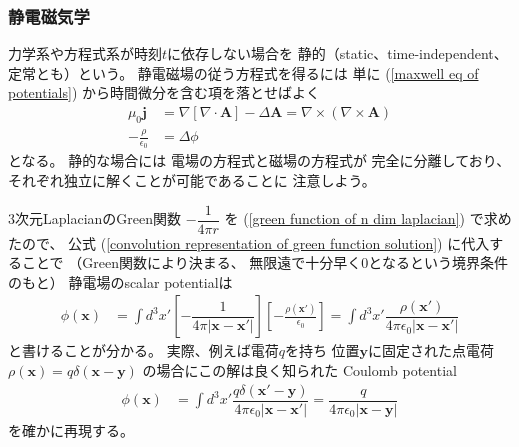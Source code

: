 \subsubsection{静電磁気学}

力学系や方程式系が時刻$t$に依存しない場合を
静的（static、time-independent、定常とも）という。
静電磁場の従う方程式を得るには
単に
(\ref{maxwell eq of potentials})
から時間微分を含む項を落とせばよく
\begin{subequations}
\begin{align}
  \mu_0 \bm{j}
&=
  \nabla
  \left[
    \nabla \cdot
      \bm{A}
  \right]
  -
    \Delta
    \bm{A}
=
  \nabla \times
    (\nabla \times \bm{A})
\label{static eq for ele-mag vector potential}
\\
  - \frac{\rho}{\epsilon_0}
&=
  \Delta \phi
\end{align}
\end{subequations}
となる。
静的な場合には
電場の方程式と磁場の方程式が
完全に分離しており、
それぞれ独立に解くことが可能であることに
注意しよう。

$3$次元LaplacianのGreen関数
$ - \dfrac{1}{4 \pi r} $
を
(\ref{green function of n dim laplacian})
で求めたので、
公式
(\ref{convolution representation of green function solution})
に代入することで
（Green関数により決まる、
無限遠で十分早く$0$となるという境界条件のもと）
静電場のscalar potentialは
\begin{align}
  \phi (\bm{x})
&=
  \int d^3 x'
  \left[
    - \dfrac{1}{
      4 \pi |\bm{x} - \bm{x}'|
    }
  \right]
  \left[
    - \frac{\rho(\bm{x}')}{\epsilon_0}
  \right]
=
  \int d^3 x'
    \dfrac{\rho(\bm{x}')}{
      4 \pi \epsilon_0
      |\bm{x} - \bm{x}'|
    }
\end{align}
と書けることが分かる。
実際、例えば電荷$q$を持ち
位置$\bm{y}$に固定された点電荷
$\rho(\bm{x})
= q \delta(\bm{x} - \bm{y})$
の場合にこの解は良く知られた
Coulomb potential
\begin{align}
  \phi (\bm{x})
&=
  \int d^3 x'
    \dfrac{
      q \delta(\bm{x}' - \bm{y})
    }{
      4 \pi \epsilon_0
      |\bm{x} - \bm{x}'|
    }
=
    \dfrac{ q }{
      4 \pi \epsilon_0
      |\bm{x} - \bm{y}|
    }
\end{align}
を確かに再現する。

